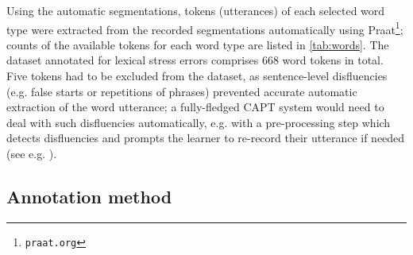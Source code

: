 \documentclass[a4paper]{article}
\newcommand{\TODO}[1]{{\color{red}\textbf{[TODO #1]}}}
\begin{document}
	Using the automatic segmentations, tokens (utterances) of each selected word type were extracted from the recorded segmentations automatically using Praat\footnote{\texttt{praat.org}}; counts of the available tokens for each word type are listed in \cref{tab:words}. 
	The dataset annotated for lexical stress errors comprises 668 word tokens in total. Five tokens had to be excluded from the dataset, as sentence-level disfluencies (e.g. false starts or repetitions of phrases) prevented accurate automatic extraction of the word utterance; a fully-fledged CAPT system would need to deal with such disfluencies automatically, e.g. with a pre-processing step  which detects disfluencies and prompts the learner to re-record their utterance if needed 
	(see e.g. %
	\cite{Orosanu2012}).
		
		\subsection{Annotation method}
		\label{sec:data:annotation}	
		
\end{document}
